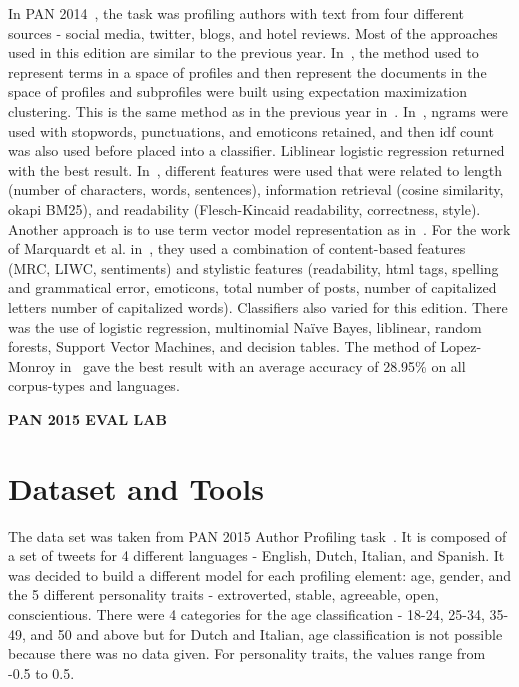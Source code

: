 \documentclass[a4paper]{llncs}
\begin{document}
In PAN 2014~\cite{rangel2014overview}, the task was profiling authors with text from four different sources - social media, twitter, blogs, and hotel reviews. Most of the approaches used in this edition are similar to the previous year. In~\cite{lopezusing}, the method used to represent terms in a space of profiles and then represent the documents in the space of profiles and subprofiles were built using expectation maximization clustering. This is the same method as in the previous year in~\cite{lopez2013inaoe}. In~\cite{maharjansimple}, ngrams were used with stopwords, punctuations, and emoticons retained, and then idf count was also used before placed into a classifier. Liblinear logistic regression returned with the best result. In~\cite{weren6exploring}, different features were used that were related to length (number of characters, words, sentences), information retrieval (cosine similarity, okapi BM25), and readability (Flesch-Kincaid readability, correctness, style). Another approach is to use term vector model representation as in~\cite{villenadaedalus}. For the work of Marquardt et al. in~\cite{marquardt2014age}, they used a combination of content-based features (MRC, LIWC, sentiments) and stylistic features (readability, html tags, spelling and grammatical error, emoticons, total number of posts, number of capitalized letters number of capitalized words). Classifiers also varied for this edition. There was the use of logistic regression, multinomial Naïve Bayes, liblinear, random forests, Support Vector Machines, and decision tables. The method of Lopez-Monroy in~\cite{lopezusing} gave the best result with an average accuracy of 28.95\% on all corpus-types and languages. 

\textbf{PAN 2015 EVAL LAB}


\section{Dataset and Tools}
The data set was taken from PAN 2015 Author Profiling task~\cite{rangel2015overview}. It is composed of a set of tweets for 4 different languages - English, Dutch, Italian, and Spanish. It was decided to build a different model for each profiling element: age, gender, and the 5 different personality traits - extroverted, stable, agreeable, open, conscientious. There were 4 categories for the age classification - 18-24, 25-34, 35-49, and 50 and above but for Dutch and Italian, age classification is not possible because there was no data given. For personality traits, the values range from -0.5 to 0.5.
\end{document}
